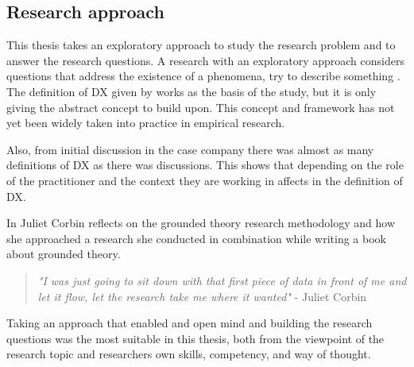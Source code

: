 \documentclass[english, 12pt, a4paper, sci, utf8, a-1b, online]{aaltothesis}
\begin{document}


\subsection{Research approach}

This thesis takes an exploratory approach to study the research problem and to answer the research questions. A research with an exploratory approach considers questions that address the existence of a phenomena, try to describe something \citep{easterbrook2008selecting}. The definition of DX given by \cite{fagerholm-dx-concept-and-definition} works as the basis of the study, but it is only giving the abstract concept to build upon. This concept and framework has not yet been widely taken into practice in empirical research.

Also, from initial discussion in the case company there was almost as many definitions of DX as there was discussions. This shows that depending on the role of the practitioner and the context they are working in affects in the definition of DX.

In \cite{developing-grounded-theory} Juliet Corbin reflects on the grounded theory research methodology and how she approached a research she conducted in combination while writing a book \citep{basics-of-qualitative-research} about grounded theory.

\begin{quotation}
  \textit{"I was just going to sit down with that first piece of data in front of me and let it flow, let the research take me where it wanted"} - Juliet Corbin \citep[p.~43]{developing-grounded-theory}
\end{quotation}

Taking an approach that enabled and open mind and building the research questions was the most suitable in this thesis, both from the viewpoint of the research topic and researchers own skills, competency, and way of thought.
\end{document}
